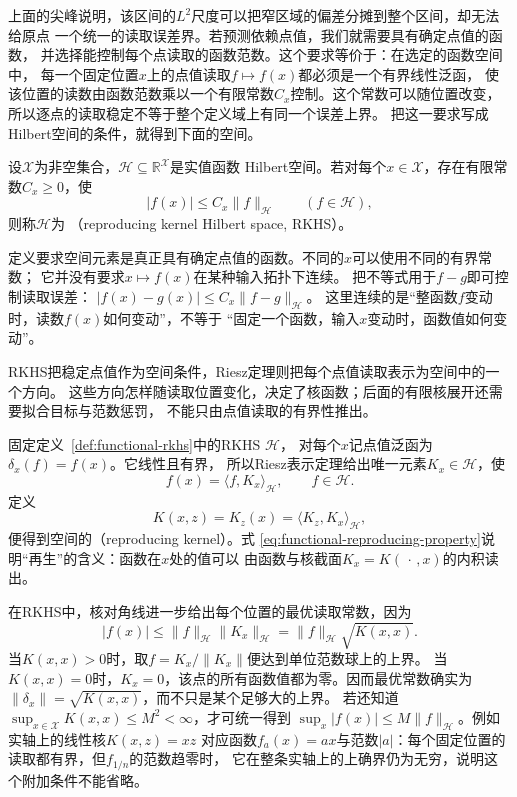 上面的尖峰说明，该区间的$L^2$尺度可以把窄区域的偏差分摊到整个区间，却无法给原点
一个统一的读取误差界。若预测依赖点值，我们就需要具有确定点值的函数，
并选择能控制每个点读取的函数范数。这个要求等价于：在选定的函数空间中，
每一个固定位置$x$上的点值读取$f\mapsto f(x)$都必须是一个有界线性泛函，
使该位置的读数由函数范数乘以一个有限常数$C_x$控制。这个常数可以随位置改变，
所以逐点的读取稳定不等于整个定义域上有同一个误差上界。
把这一要求写成Hilbert空间的条件，就得到下面的空间。
\begin{definition}[再生核Hilbert空间]
\label{def:functional-rkhs}
设$\mathcal X$为非空集合，$\mathcal H\subseteq\mathbb R^{\mathcal X}$是实值函数
Hilbert空间。若对每个$x\in\mathcal X$，存在有限常数$C_x\geq0$，使
\[
 |f(x)|\leq C_x\lVert f\rVert_{\mathcal H}\qquad(f\in\mathcal H),
\]
则称$\mathcal H$为
（reproducing kernel Hilbert space, RKHS）。
\end{definition}
定义要求空间元素是真正具有确定点值的函数。不同的$x$可以使用不同的有界常数；
它并没有要求$x\mapsto f(x)$在某种输入拓扑下连续。
把不等式用于$f-g$即可控制读取误差：
$|f(x)-g(x)|\leq C_x\lVert f-g\rVert_{\mathcal H}$。
这里连续的是“整函数$f$变动时，读数$f(x)$如何变动”，不等于
“固定一个函数，输入$x$变动时，函数值如何变动”。

RKHS把稳定点值作为空间条件，Riesz定理则把每个点值读取表示为空间中的一个方向。
这些方向怎样随读取位置变化，决定了核函数；后面的有限核展开还需要拟合目标与范数惩罚，
不能只由点值读取的有界性推出。

固定定义~\ref{def:functional-rkhs}中的RKHS $\mathcal H$，
对每个$x$记点值泛函为$\delta_x(f)=f(x)$。它线性且有界，
所以Riesz表示定理给出唯一元素$K_x\in\mathcal{H}$，使
\begin{equation}
  f(x)=\langle f,K_x\rangle_{\mathcal{H}},
  \qquad f\in\mathcal{H}.
  \label{eq:functional-reproducing-property}
\end{equation}
定义
\[
  K(x,z)=K_z(x)
  =\langle K_z,K_x\rangle_{\mathcal{H}},
\]
便得到空间的（reproducing kernel）。式
\eqref{eq:functional-reproducing-property}说明“再生”的含义：函数在$x$处的值可以
由函数与核截面$K_x=K(\,\cdot\,,x)$的内积读出。

在RKHS中，核对角线进一步给出每个位置的最优读取常数，因为
\begin{equation}
  |f(x)|
  \leq
  \lVert f\rVert_{\mathcal{H}}
  \lVert K_x\rVert_{\mathcal{H}}
  =
  \lVert f\rVert_{\mathcal{H}}\sqrt{K(x,x)}.
  \label{eq:functional-rkhs-pointwise-bound}
\end{equation}
当$K(x,x)>0$时，取$f=K_x/\lVert K_x\rVert$便达到单位范数球上的上界。
当$K(x,x)=0$时，$K_x=0$，该点的所有函数值都为零。因而最优常数确实为
$\lVert\delta_x\rVert=\sqrt{K(x,x)}$，而不只是某个足够大的上界。
若还知道$\sup_{x\in\mathcal X}K(x,x)\leq M^2<\infty$，才可统一得到
$\sup_x|f(x)|\leq M\lVert f\rVert_{\mathcal H}$。例如实轴上的线性核$K(x,z)=xz$
对应函数$f_a(x)=ax$与范数$|a|$：每个固定位置的读取都有界，但$f_{1/n}$的范数趋零时，
它在整条实轴上的上确界仍为无穷，说明这个附加条件不能省略。

